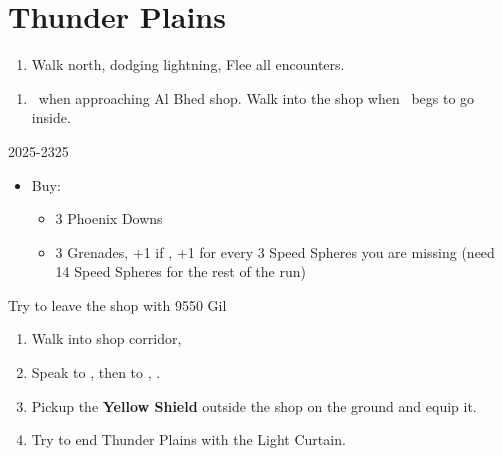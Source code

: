 \chapter{Thunder Plains}

\begin{enumerate}
	\item Walk north, dodging lightning, Flee all encounters.
\end{enumerate}
\begin{enumerate}[resume]
	\item \sd\ when approaching Al Bhed shop. Walk into the shop when \rikku\ begs to go inside.
\end{enumerate}
\begin{shop}{2025-2325}
	\begin{itemize}
		\item Buy:
		      \begin{itemize}
			      \item 3 Phoenix Downs
			      \item 3 Grenades, +1 if \blitzloss, +1 for every 3 Speed Spheres you are missing (need 14 Speed Spheres for the rest of the run)
		      \end{itemize}
	\end{itemize}
	Try to leave the shop with 9550 Gil
\end{shop}
\begin{enumerate}[resume]
	\item Walk into shop corridor, \cs[2:00]
	\item Speak to \auron, then to \rikku, \sd.
	\item Pickup the \textbf{Yellow Shield} outside the shop on the ground and equip it.
	\item Try to end Thunder Plains with the Light Curtain.
\end{enumerate}
